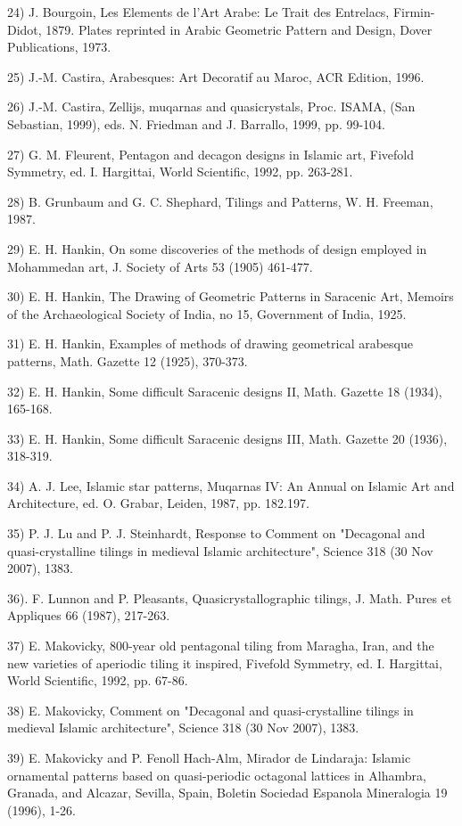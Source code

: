 24) J. Bourgoin, Les Elements de l'Art Arabe: Le Trait des Entrelacs, 
Firmin-Didot, 1879. Plates reprinted in Arabic Geometric Pattern and 
Design, Dover Publications, 1973.

25) J.-M. Castira, Arabesques: Art Decoratif au Maroc, ACR Edition, 
1996.
 
26) J.-M. Castira, Zellijs, muqarnas and quasicrystals, Proc. ISAMA, 
(San Sebastian, 1999), eds. N. Friedman and J. Barrallo, 1999, pp. 
99-104.
 
27) G. M. Fleurent, Pentagon and decagon designs in Islamic art, 
Fivefold Symmetry, ed. I. Hargittai, World Scientific, 1992, pp.
263-281.
 
28) B. Grunbaum and G. C. Shephard, Tilings and Patterns, W. H. 
Freeman, 1987.
 
29) E. H. Hankin, On some discoveries of the methods of design employed 
in Mohammedan art, J. Society of Arts 53 (1905) 461-477.
 
30) E. H. Hankin, The Drawing of Geometric Patterns in Saracenic Art, 
Memoirs of the Archaeological Society of India, no 15, Government of 
India, 1925.
 
31) E. H. Hankin, Examples of methods of drawing geometrical arabesque 
patterns, Math. Gazette 12 (1925), 370-373.

32) E. H. Hankin, Some difficult Saracenic designs II, Math. Gazette 
18 (1934), 165-168.
 
33) E. H. Hankin, Some difficult Saracenic designs III, Math. Gazette 
20 (1936), 318-319.
 
34) A. J. Lee, Islamic star patterns, Muqarnas IV: An Annual on 
Islamic Art and Architecture, ed. O. Grabar, Leiden, 1987, pp. 182.197.
 
35) P. J. Lu and P. J. Steinhardt, Response to Comment on "Decagonal
and quasi-crystalline tilings in medieval Islamic architecture", 
Science 318 (30 Nov 2007), 1383.
 
36). F. Lunnon and P. Pleasants, Quasicrystallographic tilings, J. 
Math. Pures et Appliques 66 (1987), 217-263.
 
37) E. Makovicky, 800-year old pentagonal tiling from Maragha, Iran, 
and the new varieties of aperiodic tiling it inspired, Fivefold 
Symmetry, ed. I. Hargittai, World Scientific, 1992, pp. 67-86.
 
38) E. Makovicky, Comment on "Decagonal and quasi-crystalline tilings 
in medieval Islamic architecture", Science 318 (30 Nov 2007), 1383.
 
39) E. Makovicky and P. Fenoll Hach-Alm, Mirador de Lindaraja: Islamic 
ornamental patterns based on quasi-periodic octagonal lattices 
in Alhambra, Granada, and Alcazar, Sevilla, Spain, Boletin Sociedad 
Espanola Mineralogia 19 (1996), 1-26.
 
